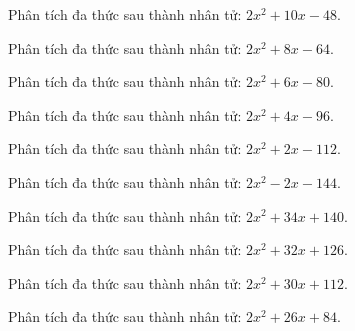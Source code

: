\begin{bt}
	Phân tích đa thức sau thành nhân tử: $2 x^2 + 10 x - 48$.
\end{bt}
\begin{bt}
	Phân tích đa thức sau thành nhân tử: $2 x^2 + 8 x - 64$.
\end{bt}
\begin{bt}
	Phân tích đa thức sau thành nhân tử: $2 x^2 + 6 x - 80$.
\end{bt}
\begin{bt}
	Phân tích đa thức sau thành nhân tử: $2 x^2 + 4 x - 96$.
\end{bt}
\begin{bt}
	Phân tích đa thức sau thành nhân tử: $2 x^2 + 2 x - 112$.
\end{bt}
\begin{bt}
	Phân tích đa thức sau thành nhân tử: $2 x^2 - 2 x - 144$.
\end{bt}
\begin{bt}
	Phân tích đa thức sau thành nhân tử: $2 x^2 + 34 x + 140$.
\end{bt}
\begin{bt}
	Phân tích đa thức sau thành nhân tử: $2 x^2 + 32 x + 126$.
\end{bt}
\begin{bt}
	Phân tích đa thức sau thành nhân tử: $2 x^2 + 30 x + 112$.
\end{bt}
\begin{bt}
	Phân tích đa thức sau thành nhân tử: $2 x^2 + 26 x + 84$.
\end{bt}

